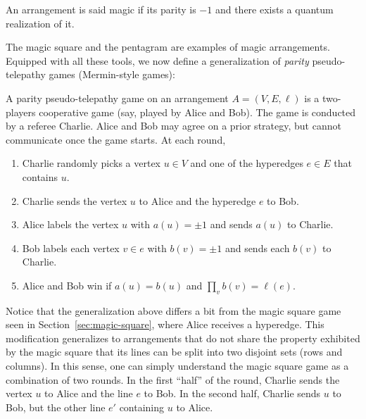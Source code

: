 \documentclass{llncs}
\begin{document}
\begin{definition}\label{def:magic-arr}
  An arrangement is said magic if its parity is \(-1\) and there exists
  a quantum realization of it.
\end{definition}

The magic square and the pentagram are examples of magic arrangements.
Equipped with all these tools, we now define a generalization of \emph{parity}
pseudo-telepathy games (Mermin-style games):

\begin{definition}\label{def:parity-game}
  A parity pseudo-telepathy game on an arrangement \(A = (V, E, \ell)\) is
  a two-players cooperative game (say, played by Alice and Bob). The
  game is conducted by a referee Charlie. Alice and Bob may agree on a
  prior strategy, but cannot communicate once the game starts. At each
  round,
  \begin{enumerate}
  \item Charlie randomly picks a vertex \(u \in V\) and one of the hyperedges
    \(e \in E\) that contains \(u\).
    
  \item Charlie sends the vertex \(u\) to Alice and the hyperedge \(e\) to Bob.
    
  \item Alice labels the vertex \(u\) with \(a(u) = \pm{}1\) and sends
    \(a(u)\) to Charlie.

  \item Bob labels each vertex \(v \in e\) with \(b(v) = \pm{}1\) and sends
    each \(b(v)\) to Charlie.
    
  \item Alice and Bob win if \(a(u) = b(u)\) and \(\prod_{v} b(v) = \ell(e)\).
  \end{enumerate}
\end{definition}

Notice that the generalization above differs a bit from the magic
square game seen in Section~\ref{sec:magic-square}, where Alice
receives a hyperedge. This modification generalizes to
arrangements that do not share the property exhibited by the magic
square that its lines can be split into two disjoint sets (rows and
columns). In this sense, one can simply understand the magic square
game as a combination of two rounds. In the first ``half'' of the
round, Charlie sends the vertex \(u\) to Alice and the line \(e\) to
Bob. In the second half, Charlie sends \(u\) to Bob, but the other
line \(e'\) containing \(u\) to Alice.
\end{document}
